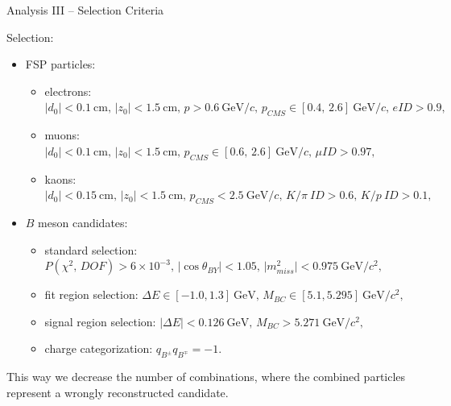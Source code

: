 \documentclass[serif]{beamer}
\newcommand {\e}[1]{\mathrm{~#1}}
\newcommand {\E}[1]{\times 10^{#1}}
\newcommand{\backupend}{
	\setcounter{framenumber}{\value{finalframe}}
}
\begin{document}
\begin{frame}[t]{Analysis III -- Selection Criteria}

\vspace{-3mm}
\small

Selection:
\begin{itemize}
	\item FSP particles:
	\begin{itemize}
		\item electrons: $\vert d_0 \vert < 0.1\e{cm},\,\vert z_0 \vert < 1.5\e{cm},\,p>0.6\e{GeV}/c,\,p_{CMS}\in[0.4,\,2.6]\e{GeV}/c,\,eID>0.9,$
		\item muons: $\vert d_0 \vert < 0.1\e{cm},\,\vert z_0 \vert < 1.5\e{cm},\,p_{CMS}\in[0.6,\,2.6]\e{GeV}/c,\,\mu ID>0.97,$
		\item kaons: $\vert d_0 \vert < 0.15\e{cm},\,\vert z_0 \vert < 1.5\e{cm},\,p_{CMS} < 2.5\e{GeV}/c,\,K/\pi~ID>0.6,\,K/p~ID>0.1,$
	\end{itemize}
	\item $B$ meson candidates:
	\begin{itemize}
		\item standard selection: $P(\chi^2,\,DOF) > 6\E{-3},\,\vert \cos \theta_{BY} \vert < 1.05,\,\vert m_{miss}^2\vert<0.975\e{GeV}/c^2,$
		\item fit region selection: $\Delta E \in [-1.0,1.3]\e{GeV},\,M_{BC} \in [5.1,5.295]\e{GeV}/c^2,$
		\item signal region selection: $\vert \Delta E \vert < 0.126\e{GeV},\,M_{BC} > 5.271\e{GeV}/c^2,$
		\item charge categorization: $q_{B^\pm}q_{B^\mp} = -1.$
	\end{itemize}
\end{itemize}

\begin{block}{}
	This way we decrease the number of combinations, where the combined particles represent a wrongly reconstructed candidate.
\end{block}

\end{frame}



\backupend
\end{document}
